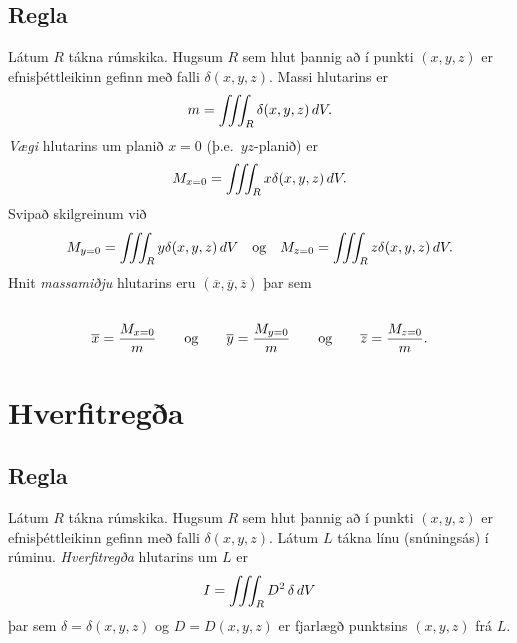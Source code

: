 \documentclass[a4paper,10pt,icelandic]{sphinxmanual}
\begin{document}
\subsection{Regla}
\label{Kafli4:id23}
Látum \(R\) tákna rúmskika. Hugsum \(R\) sem hlut þannig að í
punkti \((x,y,z)\) er efnisþéttleikinn gefinn með falli
\(\delta(x,y,z)\). Massi hlutarins er
\begin{gather}
\begin{split}\displaystyle m=\int\!\!\!\int\!\!\!\int_R \delta(x,y,z)\,dV.\end{split}\notag
\end{gather}
\emph{Vægi} hlutarins um planið \(x=0\) (þ.e. \(yz\)-planið) er
\begin{gather}
\begin{split}\displaystyle M_{x=0}=\int\!\!\!\int\!\!\!\int_R x\delta(x,y,z)\,dV.\end{split}\notag
\end{gather}
Svipað skilgreinum við
\begin{gather}
\begin{split}\displaystyle M_{y=0}=\int\!\!\!\int\!\!\!\int_R y\delta(x,y,z)\,dV \quad \text{og}\quad M_{z=0}=\int\!\!\!\int\!\!\!\int_R z\delta(x,y,z)\,dV.\end{split}\notag
\end{gather}
Hnit \emph{massamiðju} hlutarins eru
\((\overline{x}, \overline{y}, \overline{z})\) þar sem
\begin{gather}
\begin{split}\displaystyle\end{split}\notag\\\begin{split}\overline{x}=\frac{M_{x=0}}{m}
\qquad\mbox{og}\qquad
\overline{y}=\frac{M_{y=0}}{m}
\qquad\mbox{og}\qquad
\overline{z}=\frac{M_{z=0}}{m}.\end{split}\notag
\end{gather}

\section{Hverfitregða}
\label{Kafli4:hverfitrega}

\subsection{Regla}
\label{Kafli4:id24}
Látum \(R\) tákna rúmskika. Hugsum \(R\) sem hlut þannig að í
punkti \((x,y,z)\) er efnisþéttleikinn gefinn með falli
\(\delta(x,y,z)\). Látum \(L\) tákna línu (snúningsás) í rúminu.
\emph{Hverfitregða} hlutarins um \(L\) er
\begin{gather}
\begin{split}\displaystyle I=\int\!\!\!\int\!\!\!\int_R D^2 \,\delta\,dV\end{split}\notag
\end{gather}
þar sem \(\delta=\delta(x,y,z)\) og \(D=D(x,y,z)\) er fjarlægð
punktsins \((x,y,z)\) frá \(L\).
\end{document}
